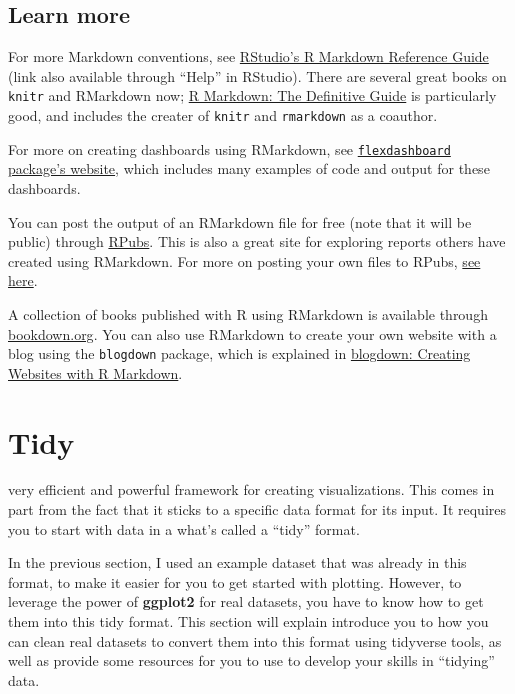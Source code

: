\documentclass[]{tufte-book}
\begin{document}
\hypertarget{learn-more-3}{%
\section{Learn more}\label{learn-more-3}}

For more Markdown conventions, see \href{https://www.rstudio.com/wp-content/uploads/2015/03/rmarkdown-reference.pdf}{RStudio's R Markdown Reference Guide} (link also available through ``Help'' in RStudio). There are several great books on \texttt{knitr} and RMarkdown now;
\href{https://bookdown.org/yihui/rmarkdown/}{R Markdown: The Definitive Guide} is particularly
good, and includes the creater of \texttt{knitr} and \texttt{rmarkdown} as a coauthor.

For more on creating dashboards using RMarkdown, see \href{https://rmarkdown.rstudio.com/flexdashboard/}{\texttt{flexdashboard} package's website}, which includes many examples
of code and output for these dashboards.

You can post the output of an RMarkdown file for free (note that it will be public) through
\href{http://www.rpubs.com/}{RPubs}. This is also a great site for exploring reports others have
created using RMarkdown.
For more on posting your own files to RPubs, \href{http://www.rpubs.com/about/getting-started}{see here}.

A collection of books published with R using RMarkdown is available through
\href{https://bookdown.org/}{bookdown.org}. You can also use RMarkdown to create your own website
with a blog using the \texttt{blogdown} package, which is explained in
\href{https://bookdown.org/yihui/blogdown/}{blogdown: Creating Websites with R Markdown}.

\hypertarget{tidy}{%
\chapter{Tidy}\label{tidy}}

 very efficient and powerful
framework for
creating visualizations. This comes in part from the fact that it sticks
to a specific data format for its input. It requires you to start with
data in a what's called a ``tidy'' format.

In the previous section, I used an example dataset that was already in this
format, to make it easier for you to get started with plotting. However,
to leverage the power of \textbf{ggplot2} for real datasets, you have to know
how to get them into this tidy format. This section will explain introduce
you to how you can clean real datasets to convert them into this format
using tidyverse tools, as well as provide some resources for you to use
to develop your skills in ``tidying'' data.
\end{document}
